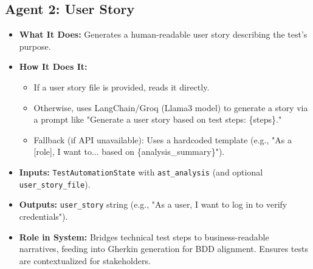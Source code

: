 \documentclass{article}
\begin{document}
\subsection{Agent 2: User Story}
\begin{itemize}
    \item \textbf{What It Does:} Generates a human-readable user story describing the test's purpose.
    \item \textbf{How It Does It:} 
        \begin{itemize}
            \item If a user story file is provided, reads it directly.
            \item Otherwise, uses LangChain/Groq (Llama3 model) to generate a story via a prompt like "Generate a user story based on test steps: \{steps\}."
            \item Fallback (if API unavailable): Uses a hardcoded template (e.g., "As a [role], I want to... based on \{analysis\_summary\}").
        \end{itemize}
    \item \textbf{Inputs:} \texttt{TestAutomationState} with \texttt{ast\_analysis} (and optional \texttt{user\_story\_file}).
    \item \textbf{Outputs:} \texttt{user\_story} string (e.g., "As a user, I want to log in to verify credentials").
    \item \textbf{Role in System:} Bridges technical test steps to business-readable narratives, feeding into Gherkin generation for BDD alignment. Ensures tests are contextualized for stakeholders.
\end{itemize}
\end{document}
